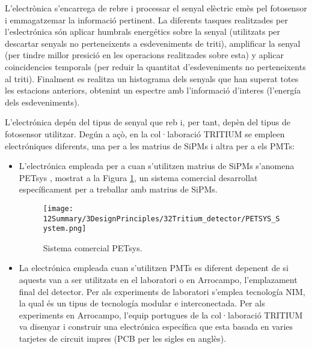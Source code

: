 L'electrònica s'encarrega de rebre i processar el senyal elèctric emès pel fotosensor i emmagatzemar la informació pertinent. La diferents tasques realitzades per l'eslectrónica són aplicar humbrals energétics sobre la senyal (utilitzats per descartar senyals no perteneixents a esdeveniments de triti), amplificar la senyal (per tindre millor presició en les operacions realitzades sobre esta) y aplicar coincidencies temporals (per reduir la quantitat d'esdeveniments no perteneixents al triti). Finalment es realitza un histograma dels senyals que han superat totes les estacions anteriors, obtenint un espectre amb l'informació d'interes (l'energía dels esdeveniments). 

L'electrónica depén del tipus de senyal que reb i, per tant, depèn del tipus de fotosensor utilitzar. Degún a açò, en la col·laboració TRITIUM se empleen electróniques diferents, una per a les matrius de SiPMs i altra per a els PMTs:

\begin{itemize}

\item{} L'electrónica empleada per a cuan s'utilitzen matrius de SiPMs s'anomena PETsys \cite{PETSYS}, mostrat a la Figura \ref{fig:PETSYSs}, un sistema comercial desarrollat específicament per a treballar amb matrius de SiPMs. 

\begin{figure}[h]
\texttt{[image: 12Summary/3DesignPrinciples/32Tritium\_detector/PETSYS\_System.png]}
\centering
\caption{Sistema comercial PETsys\label{fig:PETSYSs}.}
\end{figure}

\item{} La electrónica empleada cuan s'utilitzen PMTs es diferent depenent de si aquests van a ser utilitzats en el laboratori o en Arrocampo, l'emplazament final del detector. Per als experiments de laboratori s'emplea tecnología NIM, la qual és un tipus de tecnología modular e interconectada. Per als experiments en Arrocampo, l'equip portugues de la col·laboració TRITIUM va disenyar i construir una electrónica específica que esta basada en varies tarjetes de circuit impres (PCB per les sigles en anglès).

\end{itemize}